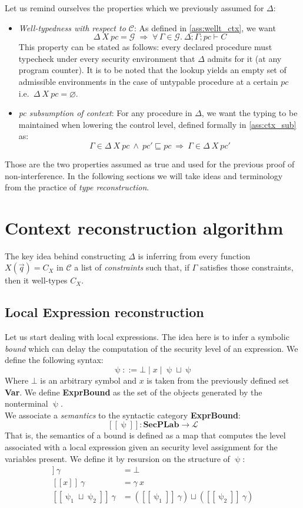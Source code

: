 \documentclass[12pt,a4paper,twoside]{book}
\newcommand{\llbracket}{[\![}
\newcommand{\rrbracket}{]\!]}
\newcommand{\MCL}{\mathscr{L}}
\begin{document}
Let us remind ourselves the properties which we previously assumed for $\Delta$:
\begin{itemize}
\item \emph{Well-typedness with respect to $\mathscr{C}$}: As defined in \ref{ass:wellt_ctx}, we want
$$
\Delta~X~pc = \mathcal{G}
\;\Longrightarrow\;
\forall\,\Gamma \in \mathcal{G}.\ \Delta;\Gamma;pc \vdash C
$$
This property can be stated as follows: every declared procedure must typecheck under every security environment that \(\Delta\) admits for it (at any program counter). It is to be noted that the lookup yields an empty set of admissible environments in the case of untypable procedure at a certain $pc$ i.e.\ \(\Delta~X~pc=\varnothing\).
\item \emph{pc subsumption of context}: For any procedure in $\Delta$, we want the typing to be maintained when lowering the control level, defined formally in \ref{ass:ctx_sub} as:
$$
  \Gamma \in \Delta~X~pc\ \wedge\ pc' \sqsubseteq pc
  \ \Longrightarrow\
  \Gamma \in \Delta~X~pc'
$$
\end{itemize}
Those are the two properties assumed as true and used for the previous proof of non-interference. In the following sections we will take ideas and terminology from the practice of \emph{type reconstruction}\cite{pierce2002types}.

\section{Context reconstruction algorithm}
The key idea behind constructing $\Delta$ is inferring from every function $X(\vec{q}) = C_X$ in $\mathscr{C}$ a list of \emph{constraints} such that, if $\Gamma$ satisfies those constraints, then it well-types $C_X$.

\subsection{Local Expression reconstruction}
Let us start dealing with local expressions. The idea here is to infer a symbolic \emph{bound} which can delay the computation of the security level of an expression. We define the following syntax:
$$
\uppsi ::= \bot \mid x \mid \uppsi \sqcup \uppsi
$$
Where $\bot$ is an arbitrary symbol and $x$ is taken from the previously defined set \textbf{Var}. We define \textbf{ExprBound} as the set of the objects generated by the nonterminal $\uppsi$.\\
We associate a \emph{semantics} to the syntactic category \textbf{ExprBound}:
$$\llbracket \uppsi \rrbracket: \textbf{SecPLab} \rightarrow \MCL$$
That is, the semantics of a bound is defined as a map that computes the level associated with a local expression given an security level assignment for the variables present. We define it by resursion on the structure of $\uppsi$:
\begin{align*}
\llbracket \bot \rrbracket~\gamma &= \bot\\
\llbracket x \rrbracket~\gamma &= \gamma~x\\
\llbracket \uppsi_1 \sqcup \uppsi_2 \rrbracket~\gamma &= (\llbracket \uppsi_1 \rrbracket~\gamma) \sqcup (\llbracket \uppsi_2 \rrbracket~\gamma)
\end{align*}
\end{document}
